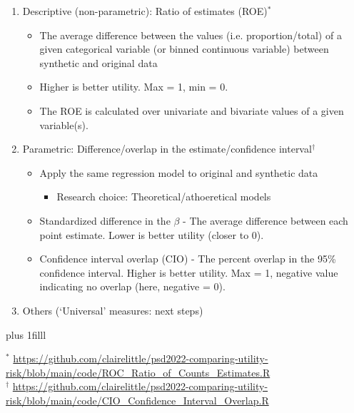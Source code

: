 \documentclass[t,8pt,utfx8]{beamer}
\newcommand{\btVFill}{\vskip0pt plus 1filll}
\begin{document}
\begin{spacing}{1.25}
{\begin{enumerate}
    \item Descriptive (non-parametric):  Ratio of estimates (ROE)$^*$ 
    \begin{itemize}
        \item The average difference between the values (i.e. proportion/total) of a given categorical variable (or binned continuous variable)  between synthetic and original data
        \item Higher is better utility.  Max = 1, min = 0.  
        \item The ROE is calculated over univariate and  bivariate values of a given variable(s).  
    \end{itemize}
    \item Parametric: Difference/overlap in the estimate/confidence interval$^\dagger$
    \begin{itemize}
        \item Apply the same regression model to original and synthetic data
        \begin{itemize}
            \item Research choice: Theoretical/athoeretical models
        \end{itemize}
        \item Standardized difference in the $\beta$ - The average difference between each point estimate.  Lower is better utility (closer to 0).
        \item Confidence interval overlap (CIO) - The percent overlap in the 95\% confidence interval.  Higher is better utility.  Max = 1, negative value indicating no overlap (here, negative = 0).
    \end{itemize}
    \item Others (`Universal' measures: next steps)
\end{enumerate}
\btVFill
\tiny

$^*$ \url{https://github.com/clairelittle/psd2022-comparing-utility-risk/blob/main/code/ROC_Ratio_of_Counts_Estimates.R} \\
$^\dagger$ \url{https://github.com/clairelittle/psd2022-comparing-utility-risk/blob/main/code/CIO_Confidence_Interval_Overlap.R}

}




\end{spacing}
\end{document}
